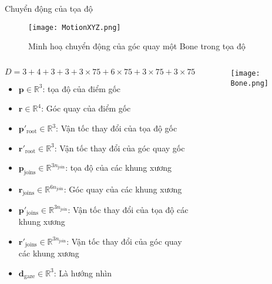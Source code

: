\begin{frame}{Chuyển động của tọa độ}
		\begin{figure}
		\centering
		\texttt{[image: MotionXYZ.png]}
		\caption{Minh hoạ chuyển động của góc quay một Bone trong tọa độ}
	\end{figure}
	\vspace{-15pt}
	\begin{columns}
		\begin{column}{0.78\textwidth}
			$$
			D = 3 + 4 + 3 + 3 + 3 \times 75 + 6 \times 75 + 3 \times 75 + 3 \times 75 + 3
			$$
			\vspace{-20pt}
			\begin{itemize}
				\item $\mathbf{p} \in \mathbb{R}^3$: tọa độ của điểm gốc
				\item $\mathbf{r} \in \mathbb{R}^4$: Góc quay của điểm gốc
				\item $\mathbf{p}'_{\text{root}} \in \mathbb{R}^3$: Vận tốc thay đổi của tọa độ gốc
				\item $\mathbf{r}'_{\text{root}} \in \mathbb{R}^3$: Vận tốc thay đổi của góc quay gốc
				
				\item $\mathbf{p}_{\text{joins}} \in \mathbb{R}^{3 n_{\text{join} }}$: tọa độ của các khung xương
				\item $\mathbf{r}_{\text{joins}} \in \mathbb{R}^{6 n_{\text{join} }}$: Góc quay của các khung xương
				\item $\mathbf{p}'_{\text{joins}} \in \mathbb{R}^{3n_{\text{join} }}$: Vận tốc thay đổi của tọa độ các khung xương
				\item $\mathbf{r}'_{\text{joins}} \in \mathbb{R}^{3n_{\text{join} }}$: Vận tốc thay đổi của góc quay các khung xương
				
				\item $\mathbf{d}_{\text{gaze}} \in \mathbb{R}^3$: Là hướng nhìn
			\end{itemize}
		\end{column}
		
		\begin{column}{0.22\textwidth}
			\vspace{12pt}
			\begin{figure}
				\centering
				\texttt{[image: Bone.png]}
			\end{figure}
			
		\end{column}
	\end{columns}
	
\end{frame}

